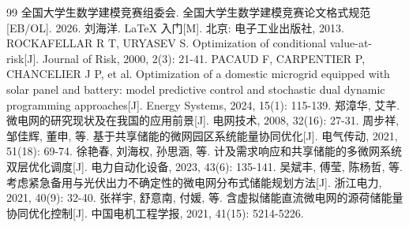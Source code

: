 \documentclass[withoutpreface]{cumcmthesis}
\begin{document}


\begin{thebibliography}{99}
     全国大学生数学建模竞赛组委会. 全国大学生数学建模竞赛论文格式规范[EB/OL]. 2026.
     刘海洋. \LaTeX{} 入门[M]. 北京: 电子工业出版社, 2013.
     ROCKAFELLAR R T, URYASEV S. Optimization of conditional value-at-risk[J]. Journal of Risk, 2000, 2(3): 21-41.
     PACAUD F, CARPENTIER P, CHANCELIER J P, et al. Optimization of a domestic microgrid equipped with solar panel and battery: model predictive control and stochastic dual dynamic programming approaches[J]. Energy Systems, 2024, 15(1): 115-139.
     郑漳华, 艾芊. 微电网的研究现状及在我国的应用前景[J]. 电网技术, 2008, 32(16): 27-31.
     周步祥, 邹佳辉, 董申, 等. 基于共享储能的微网园区系统能量协同优化[J]. 电气传动, 2021, 51(18): 69-74.
     徐艳春, 刘海权, 孙思涵, 等. 计及需求响应和共享储能的多微网系统双层优化调度[J]. 电力自动化设备, 2023, 43(6): 135-141.
     吴斌丰, 傅莹, 陈杨哲, 等. 考虑紧急备用与光伏出力不确定性的微电网分布式储能规划方法[J]. 浙江电力, 2021, 40(9): 32-40.
     张祥宇, 舒意南, 付媛, 等. 含虚拟储能直流微电网的源荷储能量协同优化控制[J]. 中国电机工程学报, 2021, 41(15): 5214-5226.
\end{thebibliography}
\end{document}
